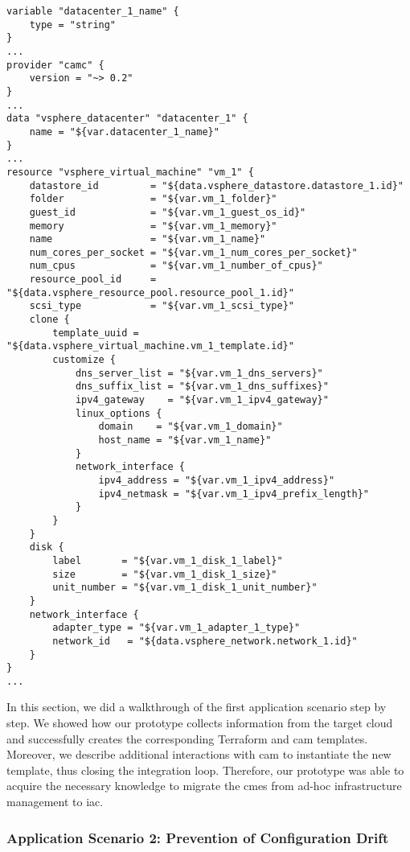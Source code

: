 \begin{lstlisting}[style=iac,caption={Declaration of VMware resources in the Terraform template},label=lst:evaluation--im-vm-declaration]
variable "datacenter_1_name" {
	type = "string"
}
...
provider "camc" {
	version = "~> 0.2"
}
...
data "vsphere_datacenter" "datacenter_1" {
	name = "${var.datacenter_1_name}"
}
...
resource "vsphere_virtual_machine" "vm_1" {
	datastore_id         = "${data.vsphere_datastore.datastore_1.id}"
	folder               = "${var.vm_1_folder}"
	guest_id             = "${var.vm_1_guest_os_id}"
	memory               = "${var.vm_1_memory}"
	name                 = "${var.vm_1_name}"
	num_cores_per_socket = "${var.vm_1_num_cores_per_socket}"
	num_cpus             = "${var.vm_1_number_of_cpus}"
	resource_pool_id     = "${data.vsphere_resource_pool.resource_pool_1.id}"
	scsi_type            = "${var.vm_1_scsi_type}"
	clone {
		template_uuid = "${data.vsphere_virtual_machine.vm_1_template.id}"
		customize {
			dns_server_list = "${var.vm_1_dns_servers}"
			dns_suffix_list = "${var.vm_1_dns_suffixes}"
			ipv4_gateway    = "${var.vm_1_ipv4_gateway}"
			linux_options {
				domain    = "${var.vm_1_domain}"
				host_name = "${var.vm_1_name}"
			}
			network_interface {
				ipv4_address = "${var.vm_1_ipv4_address}"
				ipv4_netmask = "${var.vm_1_ipv4_prefix_length}"
			}
		}
	}
	disk {
		label       = "${var.vm_1_disk_1_label}"
		size        = "${var.vm_1_disk_1_size}"
		unit_number = "${var.vm_1_disk_1_unit_number}"
	}
	network_interface {
		adapter_type = "${var.vm_1_adapter_1_type}"
		network_id   = "${data.vsphere_network.network_1.id}"
	}
}
...
\end{lstlisting}

In this section, we did a walkthrough of the first application scenario step by step. We showed how our prototype collects information from the target cloud and successfully creates the corresponding Terraform and \gls{cam} templates. Moreover, we describe additional interactions with \gls{cam} to instantiate the new template, thus closing the integration loop. Therefore, our prototype was able to acquire the necessary knowledge to migrate the \gls{cmes} from ad-hoc infrastructure management to \gls{iac}.

\subsubsection{Application Scenario 2: Prevention of Configuration Drift}
\label{subsubsect:evaluation--im-application-scenario-2}

